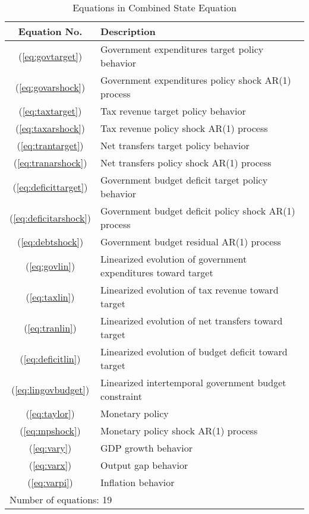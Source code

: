 \documentclass[11pt]{article}
\begin{document}
\begin{table}\caption{Equations in Combined State Equation}\label{tb:eqs}
  \begin{center}\begin{tabular}{cl}
    Equation No. & Description \\ \hline
    (\ref{eq:govtarget}) & Government expenditures target policy behavior \\
    (\ref{eq:govarshock}) & Government expenditures policy shock AR(1) process \\
    (\ref{eq:taxtarget}) & Tax revenue target policy behavior  \\
    (\ref{eq:taxarshock}) & Tax revenue policy shock AR(1) process \\
    (\ref{eq:trantarget}) & Net transfers target policy behavior \\
    (\ref{eq:tranarshock}) & Net transfers policy shock AR(1) process \\
    (\ref{eq:deficittarget}) & Government budget deficit target policy behavior \\
    (\ref{eq:deficitarshock}) & Government budget deficit policy shock AR(1) process\\
    (\ref{eq:debtshock}) & Government budget residual AR(1) process \\
    (\ref{eq:govlin}) & Linearized evolution of government expenditures toward target \\
    (\ref{eq:taxlin})  & Linearized evolution of tax revenue toward target \\
    (\ref{eq:tranlin}) & Linearized evolution of net transfers toward target \\
    (\ref{eq:deficitlin}) & Linearized evolution of budget deficit toward target \\
    (\ref{eq:lingovbudget}) & Linearized intertemporal government budget constraint\\
    (\ref{eq:taylor}) & Monetary policy \\
    (\ref{eq:mpshock}) & Monetary policy shock AR(1) process \\
    (\ref{eq:vary}) & GDP growth behavior \\
    (\ref{eq:varx}) & Output gap behavior \\
    (\ref{eq:varpi}) & Inflation behavior \\ \hline
    \multicolumn{2}{l}{Number of equations: 19} \\    
  \end{tabular}\end{center}
\end{table}
\end{document}
